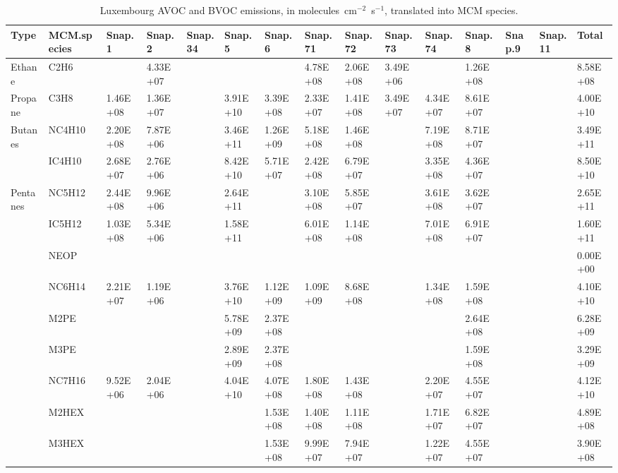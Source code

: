 \tiny
\begin{longtable}{lllllllllllllll}
	\caption{Luxembourg AVOC and BVOC emissions, in molecules~cm$^{-2}$~s$^{-1}$, translated into MCM species.}\\%
	\hline \hline
	\textbf{Type} & \textbf{MCM.species} & \textbf{Snap.1} & \textbf{Snap.2} & \textbf{Snap.34} & \textbf{Snap.5} & \textbf{Snap.6} & \textbf{Snap.71} & \textbf{Snap.72} & \textbf{Snap.73} & \textbf{Snap.74} & \textbf{Snap.8} & \textbf{Snap.9} & \textbf{Snap.11} & \textbf{Total}\\
	\endhead
	\hline
	Ethane & C2H6 &  & 4.33E+07 &  &  &  & 4.78E+08 & 2.06E+08 & 3.49E+06 &  & 1.26E+08 &  &  & 8.58E+08 \\
	\hline Propane & C3H8 & 1.46E+08 & 1.36E+07 &  & 3.91E+10 & 3.39E+08 & 2.33E+07 & 1.41E+08 & 3.49E+07 & 4.34E+07 & 8.61E+07 &  &  & 4.00E+10 \\ \hline
	\multirow{2}{*}{Butanes} & NC4H10 & 2.20E+08 & 7.87E+06 &  & 3.46E+11 & 1.26E+09 & 5.18E+08 & 1.46E+08 &  & 7.19E+08 & 8.71E+07 &  &  & 3.49E+11 \\
	 & IC4H10 & 2.68E+07 & 2.76E+06 &  & 8.42E+10 & 5.71E+07 & 2.42E+08 & 6.79E+07 &  & 3.35E+08 & 4.36E+07 &  &  & 8.50E+10 \\
	\hline \multirow{3}{*}{Pentanes} & NC5H12 & 2.44E+08 & 9.96E+06 &  & 2.64E+11 &  & 3.10E+08 & 5.85E+07 &  & 3.61E+08 & 3.62E+07 &  &  & 2.65E+11 \\
	 & IC5H12 & 1.03E+08 & 5.34E+06 &  & 1.58E+11 &  & 6.01E+08 & 1.14E+08 &  & 7.01E+08 & 6.91E+07 &  &  & 1.60E+11 \\
	 & NEOP &  &  &  &  &  &  &  &  &  &  &  &  & 0.00E+00 \\
	\hline \parbox[t]{2mm}{} & NC6H14 & 2.21E+07 & 1.19E+06 &  & 3.76E+10 & 1.12E+09 & 1.09E+09 & 8.68E+08 &  & 1.34E+08 & 1.59E+08 &  &  & 4.10E+10 \\
	 & M2PE &  &  &  & 5.78E+09 & 2.37E+08 &  &  &  &  & 2.64E+08 &  &  & 6.28E+09 \\
	 & M3PE &  &  &  & 2.89E+09 & 2.37E+08 &  &  &  &  & 1.59E+08 &  &  & 3.29E+09 \\
	 & NC7H16 & 9.52E+06 & 2.04E+06 &  & 4.04E+10 & 4.07E+08 & 1.80E+08 & 1.43E+08 &  & 2.20E+07 & 4.55E+07 &  &  & 4.12E+10 \\
	 & M2HEX &  &  &  &  & 1.53E+08 & 1.40E+08 & 1.11E+08 &  & 1.71E+07 & 6.82E+07 &  &  & 4.89E+08 \\
	 & M3HEX &  &  &  &  & 1.53E+08 & 9.99E+07 & 7.94E+07 &  & 1.22E+07 & 4.55E+07 &  &  & 3.90E+08 \\

\end{longtable}
